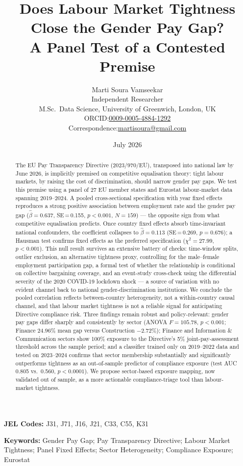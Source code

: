 \documentclass[12pt,a4paper]{article}
\title{\Large\textbf{Does Labour Market Tightness Close the Gender Pay Gap?\\[4pt]
       A Panel Test of a Contested Premise}}
\author{Marti Soura Vamseekar\\[6pt]
        \small Independent Researcher\\
        \small M.Sc.\ Data Science, University of Greenwich, London, UK\\[4pt]
        \small ORCID:\;\href{https://orcid.org/0009-0005-4884-1292}{0009-0005-4884-1292}\\
        \small Correspondence:\;\href{mailto:martisoura@gmail.com}{martisoura@gmail.com}}
\date{July 2026}
\begin{document}
\maketitle
\thispagestyle{empty}

\vspace{1em}
\noindent\textbf{JEL Codes:} J31, J71, J16, J21, C33, C55, K31

\smallskip
\noindent\textbf{Keywords:} Gender Pay Gap; Pay Transparency Directive; Labour
Market Tightness; Panel Fixed Effects; Sector Heterogeneity; Compliance
Exposure; Eurostat

\newpage
\setcounter{page}{1}

\begin{abstract}
\noindent
The EU Pay Transparency Directive (2023/970/EU), transposed into national law by
June 2026, is implicitly premised on competitive equalisation theory: tight
labour markets, by raising the cost of discrimination, should narrow gender pay
gaps.  We test this premise using a panel of 27 EU member states and Eurostat
labour-market data spanning 2019--2024.  A pooled cross-sectional specification
with year fixed effects reproduces a strong positive association between
employment rate and the gender pay gap ($\hat{\beta}=0.637$, SE\,=\,0.155,
$p<0.001$, $N=159$) --- the opposite sign from what competitive equalisation
predicts.  Once country fixed effects absorb time-invariant national
confounders, the coefficient collapses to $\hat{\beta}=0.113$ (SE\,=\,0.269,
$p=0.676$); a Hausman test confirms fixed effects as the preferred specification
($\chi^{2}=27.99$, $p<0.001$).  This null result survives an extensive battery of
checks: time-window splits, outlier exclusion, an alternative tightness proxy,
controlling for the male--female employment participation gap, a formal test of
whether the relationship is conditional on collective bargaining coverage, and an
event-study cross-check using the differential severity of the 2020 COVID-19
lockdown shock --- a source of variation with no evident channel back to national
gender-discrimination institutions.  We conclude the pooled correlation reflects
between-country heterogeneity, not a within-country causal channel, and that
labour market tightness is not a reliable signal for anticipating Directive
compliance risk.  Three findings remain robust and policy-relevant: gender pay
gaps differ sharply and consistently by sector (ANOVA $F=105.78$, $p<0.001$;
Finance 24.96\% mean gap versus Construction $-2.72$\%); Finance and Information
\& Communication sectors show 100\% exposure to the Directive's 5\%
joint-pay-assessment threshold across the sample period; and a classifier trained
only on 2019--2022 data and tested on 2023--2024 confirms that sector membership
substantially and significantly outperforms tightness as an out-of-sample
predictor of compliance exposure (test AUC 0.805 vs.\ 0.560, $p<0.0001$).  We
propose sector-based exposure mapping, now validated out of sample, as a more
actionable compliance-triage tool than labour-market tightness.
\end{abstract}
\end{document}
